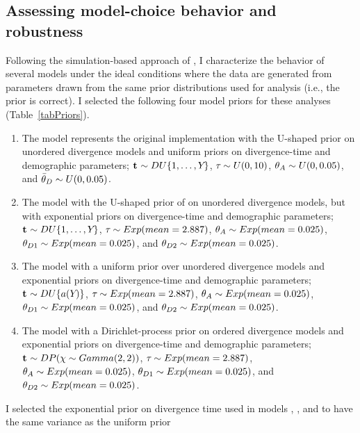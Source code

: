 \subsection{Assessing model-choice behavior and robustness}
Following the simulation-based approach of \cite{Oaks2012}, I characterize
the behavior of several models under the ideal conditions where the
data are generated from parameters drawn from the same prior distributions used
for analysis (i.e., the prior is correct).
I selected the following four model priors for these analyses
(Table~\ref{tabPriors}).
\begin{enumerate}
    \item The \modelOld model represents the original \msb implementation with
        the U-shaped prior on unordered divergence models and uniform priors on
        divergence-time and demographic parameters; $\mathbf{t_{}} \sim
        DU\{1, \ldots, Y_{}\}$, $\tau_{} \sim U(0,10)$, $\ancestralTheta{} \sim U(0,
        0.05)$, and $\descendantThetaMean{} \sim U(0, 0.05)$.
    \item The \modelUshaped model with the U-shaped prior of \msb on unordered
        divergence models, but with exponential priors on divergence-time and
        demographic parameters; $\mathbf{t_{}} \sim DU\{1, \ldots, Y_{}\}$,
        $\tau_{} \sim Exp(mean=2.887)$, $\ancestralTheta{} \sim
        Exp(mean=0.025)$, $\descendantTheta{1}{} \sim Exp(mean=0.025)$, and
        $\descendantTheta{2}{} \sim Exp(mean=0.025)$.
    \item The \modelUniform model with a uniform prior over unordered
        divergence models and exponential priors on divergence-time and
        demographic parameters; $\mathbf{t_{}} \sim DU\{a({Y_{}})\}$,
        $\tau_{} \sim Exp(mean=2.887)$, $\ancestralTheta{} \sim
        Exp(mean=0.025)$, $\descendantTheta{1}{} \sim Exp(mean=0.025)$, and
        $\descendantTheta{2}{} \sim Exp(mean=0.025)$.
    \item The \modelDPP model with a Dirichlet-process prior on ordered
        divergence models and exponential priors on divergence-time and
        demographic parameters; $\mathbf{t_{}} \sim DP(\chi \sim
        Gamma(2,2))$, $\tau_{} \sim Exp(mean=2.887)$, $\ancestralTheta{}
        \sim Exp(mean=0.025)$, $\descendantTheta{1}{} \sim Exp(mean=0.025)$,
        and $\descendantTheta{2}{} \sim Exp(mean=0.025)$.
\end{enumerate}
I selected the exponential prior on divergence time used in models \modelDPP,
\modelUniform, and \modelUshaped to have the same variance as the uniform prior
